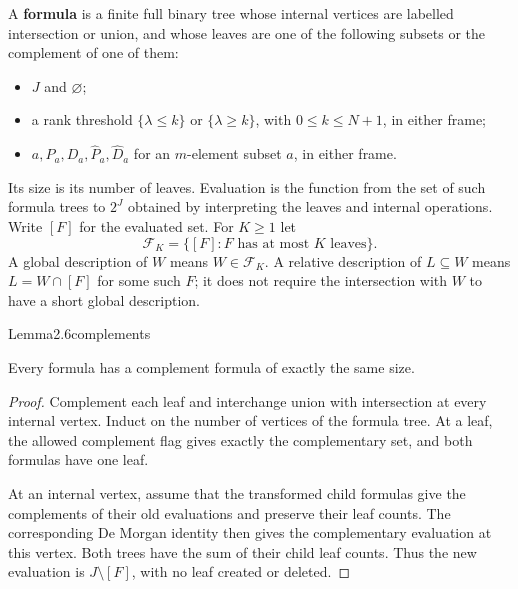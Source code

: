 A \textbf{formula} is a finite full binary tree whose internal vertices are labelled intersection or union, and whose leaves are one of the following subsets or the complement of one of them:

\begin{itemize}
\tightlist
\item
  \(J\) and \(\varnothing\);
\item
  a rank threshold \(\{\lambda\leq k\}\) or \(\{\lambda\geq k\}\), with \(0\leq k\leq N+1\), in either frame;
\item
  \(a,P_a,D_a,\widehat P_a,\widehat D_a\) for an \(m\)-element subset \(a\), in either frame.
\end{itemize}

Its size is its number of leaves. Evaluation is the function from the set of such formula trees to \(2^J\) obtained by interpreting the leaves and internal operations. Write \([F]\) for the evaluated set. For \(K\geq1\) let \[
\mathcal F_K=\{[F]:F\text{ has at most }K\text{ leaves}\}.
\] A global description of \(W\) means \(W\in\mathcal F_K\). A relative description of \(L\subseteq W\) means \(L=W\cap[F]\) for some such \(F\); it does not require the intersection with \(W\) to have a short global description.

\begin{numbered}{Lemma}{2.6}{complements}

Every formula has a complement formula of exactly the same size.

\end{numbered}

\begin{proof}
Complement each leaf and interchange union with intersection at every internal vertex. Induct on the number of vertices of the formula tree. At a leaf, the allowed complement flag gives exactly the complementary set, and both formulas have one leaf.

At an internal vertex, assume that the transformed child formulas give the complements of their old evaluations and preserve their leaf counts. The corresponding De Morgan identity then gives the complementary evaluation at this vertex. Both trees have the sum of their child leaf counts. Thus the new evaluation is \(J\setminus[F]\), with no leaf created or deleted.
\end{proof}

